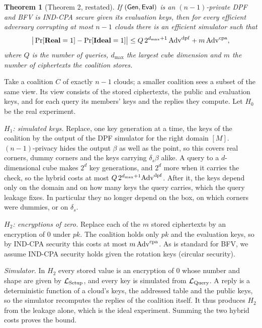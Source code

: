 \documentclass[10pt,journal,compsoc]{IEEEtran}
\newtheorem*{theorem*}{Theorem}
\begin{document}
\begin{theorem*}[Theorem 2, restated]
If $(\mathsf{Gen},\mathsf{Eval})$ is an $(n{-}1)$-private DPF and BFV is IND-CPA secure given
its evaluation keys, then for every efficient adversary corrupting at most
$n-1$ clouds there is an efficient simulator such that
\[
\big|\Pr[\mathbf{Real}=1]-\Pr[\mathbf{Ideal}=1]\big|\le Q\,2^{d_{\max}+1}\,\mathrm{Adv}^{\mathrm{dpf}}+m\,\mathrm{Adv}^{\mathrm{cpa}} ,
\]
where $Q$ is the number of queries, $d_{\max}$ the largest cube dimension and
$m$ the number of ciphertexts the coalition stores.
\end{theorem*}

\begin{IEEEproof}
Take a coalition $C$ of exactly $n-1$ clouds; a smaller coalition sees a
subset of the same view. Its view consists of the stored ciphertexts, the
public and evaluation keys, and for each query its members' keys and the
replies they compute. Let $H_0$ be the real experiment.

\emph{$H_1$: simulated keys.} Replace, one key generation at a time, the keys
of the coalition by the output of the DPF simulator for the right domain $[M]$.
$(n{-}1)$-privacy hides the output $\beta$ as well as the point, so this
covers real corners, dummy corners and the keys carrying $\delta_s\beta$ alike.
A query to a $d$-dimensional cube makes $2^d$ key generations, and $2^d$ more
when it carries the check, so the hybrid costs at most
$Q\,2^{d_{\max}+1}\mathrm{Adv}^{\mathrm{dpf}}$. After it, the keys depend only on the domain and
on how many keys the query carries, which the query leakage fixes. In
particular they no longer depend on the box, on which corners were dummies, or
on $\delta_s$.

\emph{$H_2$: encryptions of zero.} Replace each of the $m$ stored ciphertexts
by an encryption of $0$ under $pk$. The coalition holds only $pk$ and the
evaluation keys, so by IND-CPA security this costs at most $m\,\mathrm{Adv}^{\mathrm{cpa}}$. As is
standard for BFV, we assume IND-CPA security holds given the rotation keys
(circular security).

\emph{Simulator.} In $H_2$ every stored value is an encryption of $0$ whose
number and shape are given by $\mathcal{L}_{\mathrm{Setup}}$, and every key is
simulated from $\mathcal{L}_{\mathrm{Query}}$. A reply is a deterministic function
of a cloud's keys, the addressed table and the public keys, so the simulator
recomputes the replies of the coalition itself. It thus produces $H_2$ from
the leakage alone, which is the ideal experiment. Summing the two hybrid costs
proves the bound.
\end{IEEEproof}
\end{document}
